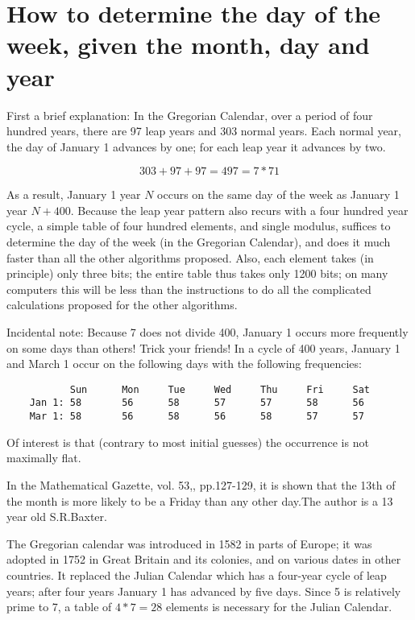 \section{How to determine the day of the week, given the month,
  day and year}
First a brief explanation: In the Gregorian Calendar, over a period of
four hundred years, there are 97 leap years and 303 normal years.  Each
normal year, the day of January 1 advances by one; for each leap year it
advances by two.

\[ 303 + 97 + 97 = 497 = 7 * 71 \]

As a result, January 1 year $N$ occurs on the same day of the week as
January 1 year $N + 400$.  Because the leap year pattern also recurs
with a four hundred year cycle, a simple table of four hundred elements,
and single modulus, suffices to determine the day of the week (in the
Gregorian Calendar), and does it much faster than all the other
algorithms proposed.  Also, each element takes (in principle) only three
bits; the entire table thus takes only 1200 bits;
on many computers this will be less than the instructions to do all the
complicated calculations proposed for the other algorithms.

Incidental note: Because 7 does not divide 400, January 1 occurs more
frequently on some days than others!  Trick your friends!  In a cycle of
400 years, January 1 and March 1 occur on the following days with the
following frequencies:

\begin{verbatim}
           Sun      Mon     Tue     Wed     Thu     Fri     Sat
    Jan 1: 58       56      58      57      57      58      56
    Mar 1: 58       56      58      56      58      57      57
\end{verbatim}

Of interest is that (contrary to most initial guesses) the occurrence is
not maximally flat.


In the Mathematical Gazette, vol. 53,, pp.127-129, it is shown that the
13th of the month is more likely to be a Friday than any other day.The
author is a 13 year old S.R.Baxter.

The Gregorian calendar was introduced in 1582 in parts of Europe; it was
adopted in 1752 in Great Britain and its colonies, and on various dates
in other countries.  It replaced the Julian Calendar which has a
four-year cycle of leap years; after four years January 1 has advanced
by five days.  Since 5 is relatively prime to 7, a table of $4 * 7 = 28$
elements is necessary for the Julian Calendar.

